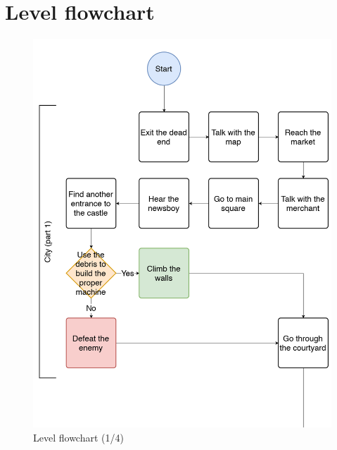 \section{Level flowchart}

\begin{figure}[H]
  \centering
  \includegraphics[width=15cm]{Images/Diagrams/dynamia_1}
  \caption{Level flowchart (1/4)}
\end{figure}

